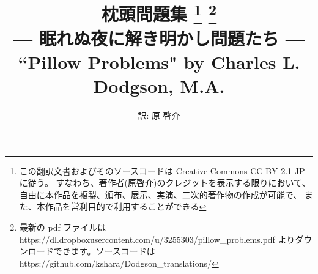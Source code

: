 \documentclass{book}
\begin{document}
\title{枕頭問題集
    \footnote{この翻訳文書およびそのソースコードは
    Creative Commons CC BY 2.1 JP に従う。
    すなわち、著作者(原啓介)のクレジットを表示する限りにおいて、
    自由に本作品を複製、頒布、展示、実演、二次的著作物の作成が可能で、
    また、本作品を営利目的で利用することができる}
    \footnote{最新の pdf ファイルは https://dl.dropboxusercontent.com/u/3255303/pillow\_problems.pdf よりダウンロードできます。ソースコードは
        https://github.com/kshara/Dodgson\_translations/}
    \\
    {\normalsize --- 眠れぬ夜に解き明かし問題たち ---}
    \\
    ``Pillow Problems" by Charles L. Dodgson, M.A.
}
\author{訳: 原 啓介}

\maketitle

\tableofcontents






\end{document}
